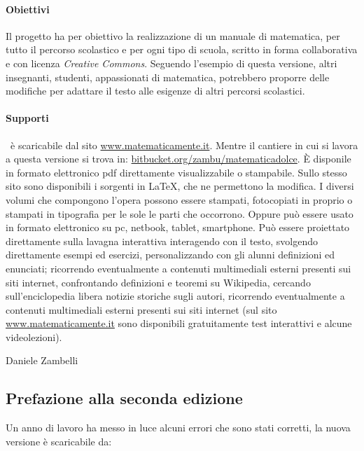\paragraph{Obiettivi} Il progetto \emph{\serie} ha per obiettivo la 
realizzazione di un manuale di matematica, per tutto il percorso scolastico 
e per ogni tipo di scuola, scritto in forma collaborativa e con licenza 
\textit{Creative Commons}. 
Seguendo l'esempio di questa versione, altri insegnanti, studenti, 
appassionati di matematica, potrebbero proporre delle modifiche per adattare 
il testo alle esigenze di altri percorsi scolastici.

\paragraph{Supporti}
\serie\ è scaricabile dal sito \url{www.matematicamente.it}. 
Mentre il cantiere in cui si lavora a questa versione si trova in:
\url{bitbucket.org/zambu/matematicadolce}. 
È disponile in formato elettronico pdf direttamente visualizzabile o 
stampabile. 
Sullo stesso sito sono disponibili i sorgenti in {\LaTeX}, 
che ne permettono la modifica. 
I diversi volumi che compongono l'opera possono essere stampati, 
fotocopiati in proprio o stampati in tipografia per le sole le parti che 
occorrono. 
Oppure può essere usato in formato elettronico su pc, netbook, tablet, 
smartphone.
Può essere proiettato direttamente sulla lavagna interattiva 
interagendo con il testo, svolgendo direttamente esempi ed esercizi, 
personalizzando con gli alunni definizioni ed enunciati; 
ricorrendo eventualmente a contenuti multimediali esterni presenti 
sui siti internet, confrontando definizioni e teoremi su Wikipedia, 
cercando sull'enciclopedia libera notizie storiche sugli autori, 
ricorrendo eventualmente a contenuti multimediali esterni presenti sui siti 
internet (sul sito \url{www.matematicamente.it} sono disponibili 
gratuitamente test interattivi e alcune videolezioni). 

\begin{flushright}
Daniele Zambelli
\end{flushright}

\newpage
\subsection*{Prefazione alla seconda edizione}

Un anno di lavoro ha messo in luce alcuni errori che sono stati corretti,
la nuova versione è scaricabile da:

